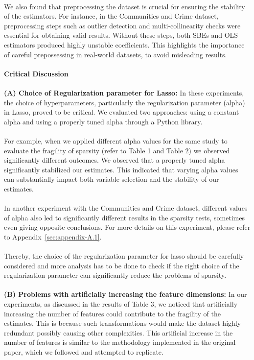 \\
We also found that preprocessing the dataset is crucial for ensuring the stability of the estimators. For instance, in the Communities and Crime dataset, preprocessing steps such as outlier detection and multi-collinearity checks were essential for obtaining valid results. Without these steps, both SBEs and OLS estimators produced highly unstable coefficients. This highlights the importance of careful prepossessing in real-world datasets, to avoid misleading results.\\
\\
{\large\textbf{Critical Discussion}}\\
\\
\textbf{(A) Choice of Regularization parameter for Lasso:}
In these experiments, the choice of hyperparameters, particularly the regularization parameter (alpha) in Lasso, proved to be critical. We evaluated two approaches: using a constant alpha and using a properly tuned alpha through a Python library. \\
\\
For example, when we applied different alpha values for the same study to evaluate the fragility of sparsity (refer to Table 1 and Table 2) we observed significantly different outcomes. We observed that a properly tuned alpha significantly stabilized our estimates. This indicated that varying alpha values can substantially impact both variable selection and the stability of our estimates.\\
\\
In another experiment with the Communities and Crime dataset, different values of alpha also led to significantly different results in the sparsity tests, sometimes even giving opposite conclusions. For more details on this experiment, please refer to Appendix~\ref{sec:appendix-A.1}.\\
\\
Thereby, the choice of the regularization parameter for lasso should be carefully considered and more analysis has to be done to check if the right choice of the regularization parameter can significantly reduce the problems of sparsity. \\
\\
\textbf{(B) Problems with artificially increasing the feature dimensions:}
In our experiments, as discussed in the results of Table 3, we noticed that artificially increasing the number of features could contribute to the fragility of the estimates. This is because such transformations would make the dataset highly redundant possibly causing other complexities. This artificial increase in the number of features is similar to the methodology implemented in the original paper, which we followed and attempted to replicate. \\
